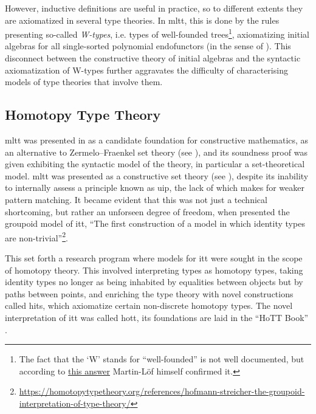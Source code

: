 \documentclass[a4paper]{article}
\begin{document}
However, inductive definitions are useful in practice, so to different extents they are axiomatized in several type theories. In \gls{mltt}, this is done by the rules presenting so-called \textit{W-types}, i.e. types of well-founded trees\footnote{The fact that the `W' stands for ``well-founded'' is not well documented, but according to \href{https://mathoverflow.net/questions/402435/why-are-w-types-called-w}{this answer} Martin-Löf himself confirmed it.}, axiomatizing initial algebras for all single-sorted polynomial endofunctors (in the sense of \cite{Abbott2005}). This disconnect between the constructive theory of initial algebras and the syntactic axiomatization of W-types further aggravates the difficulty of characterising models of type theories that involve them.

\subsection{Homotopy Type Theory}

\Gls{mltt} was presented in \cite{MartinLoef1998} as a candidate foundation for constructive mathematics, as an alternative to Zermelo–Fraenkel set theory (see \cite[Introduction]{MartinLoef1998}), and its soundness proof was given exhibiting the syntactic model of the theory, in particular a set-theoretical model. \Gls{mltt} was presented as a constructive set theory (see \cite{Nordstroem1990}), despite its inability to internally assess a principle known as \gls{uip}, the lack of which makes for weaker pattern matching. It became evident that this was not just a technical shortcoming, but rather an unforseen degree of freedom, when \textcite{Hofmann1998} presented the groupoid model of \gls{itt}, ``The first construction of a model in which identity types are non-trivial''\footnote{\url{https://homotopytypetheory.org/references/hofmann-streicher-the-groupoid-interpretation-of-type-theory/}}.

This set forth a research program where models for \gls{itt} were sought in the scope of homotopy theory. This involved interpreting types as homotopy types, taking identity types no longer as being inhabited by equalities between objects but by paths between points, and enriching the type theory with novel constructions called \glspl{hit}, which axiomatize certain non-discrete homotopy types. The novel interpretation of \gls{itt} was called \gls{hott}, its foundations are laid in the ``HoTT Book'' \cite{UnivalentFoundationsProgram2013}.
\end{document}
